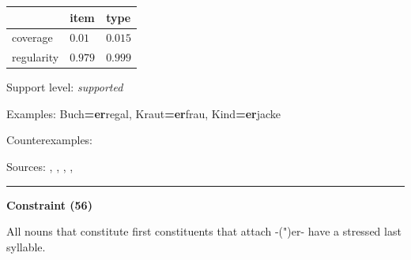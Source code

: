 \vspace{-0.25em}

\begin{table}[!ht]
\begin{center}
\setlength{\extrarowheight}{1pt}
\begin{tabularx}{\columnwidth}{|X|X|X|}
\hline
 & item & type \\
\hline
 coverage & $0.01$ & $0.015$ \\
\hline
 regularity & $0.979$ & $0.999$ \\
\hline
\end{tabularx}
\end{center}
\end{table}

\vspace{-1.35em}

\noindent
Support level: \textit{supported}

\vspace{0.3em}

\noindent
Examples: Buch\textbf{=er}regal, Kraut\textbf{=er}frau, Kind\textbf{=er}jacke

\noindent
Counterexamples: 

\vspace{0.3em}

\noindent
Sources: \citet[229]{eisenberg_2013}, \citet[9, 11, 18]{kuerschner_2010}, \citet[3]{nuebling_szczepaniak_2008}, \citet[80, 81]{nuebling_szczepaniak_2013}, \citet[98]{ortner_mueller-bollhagen_1991}

\vspace{0.35em}
\hrule




\vspace{0.4em}

\begin{center}
\textbf{Constraint (56)}
\end{center}

\noindent
All nouns that constitute first constituents that attach -(")er- have a stressed last syllable.
\vspace{0.5em}


